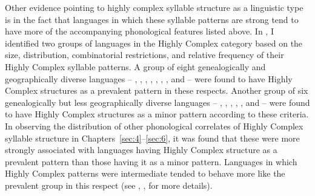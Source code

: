   Other evidence pointing to highly complex syllable structure as a linguistic type is in the fact that languages in which these syllable patterns are strong tend to have more of the accompanying phonological features listed above. In , I identified two groups of languages in the Highly Complex category based on the size, distribution, combinatorial restrictions, and relative frequency of their Highly Complex syllable patterns. A group of eight genealogically and geographically diverse languages -- , , , , , , , and  -- were found to have Highly Complex structures as a prevalent pattern in these respects. Another group of six genealogically but less geographically diverse languages -- , , , , , and  -- were found to have Highly Complex structures as a minor pattern according to these criteria. In observing the distribution of other phonological correlates of Highly Complex syllable structure in Chapters~\ref{sec:4}--\ref{sec:6}, it was found that these were more strongly associated with languages having Highly Complex structure as a prevalent pattern than those having it as a minor pattern. Languages in which Highly Complex patterns were intermediate tended to behave more like the prevalent group in this respect (see , ,  for more details).

